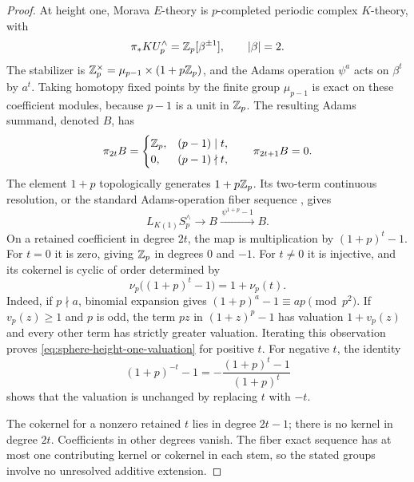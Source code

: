 \begin{proof}
At height one, Morava $E$-theory is $p$-completed periodic complex
$K$-theory, with
\[
 \pi_*KU_p^\wedge=\mathbb Z_p[\beta^{\pm1}],\qquad |\beta|=2.
\]
The stabilizer is
$\mathbb Z_p^\times=\mu_{p-1}\times(1+p\mathbb Z_p)$, and the Adams operation
$\psi^a$ acts on $\beta^t$ by $a^t$.
Taking homotopy fixed points by the finite group $\mu_{p-1}$ is exact
on these coefficient modules, because $p-1$ is a unit in $\mathbb Z_p$.
The resulting Adams summand, denoted $B$, has
\[
 \pi_{2t}B=
 \begin{cases}\mathbb Z_p,&(p-1)\mid t,\\0,&(p-1)\nmid t,
 \end{cases}
 \qquad \pi_{2t+1}B=0.
\]
The element $1+p$ topologically generates $1+p\mathbb Z_p$.  Its two-term
continuous resolution, or the standard Adams-operation fiber sequence
\citep[\S\S1--2]{hopkinsKOne}, gives
\[
 L_{K(1)}S_p^\wedge\longrightarrow B
 \xrightarrow{\,\psi^{1+p}-1\,}B.
\]
On a retained coefficient in degree $2t$, the map is multiplication
by $(1+p)^t-1$.  For $t=0$ it is zero, giving $\mathbb Z_p$ in degrees $0$
and $-1$.  For $t\neq0$ it is injective, and its cokernel is cyclic of
order determined by
\begin{equation}\label{eq:sphere-height-one-valuation}
 \nu_p\bigl((1+p)^t-1\bigr)=1+\nu_p(t).
\end{equation}
Indeed, if $p\nmid a$, binomial expansion gives
$(1+p)^a-1\equiv ap\pmod{p^2}$.  If $v_p(z)\geq1$ and $p$ is odd,
the term $pz$ in $(1+z)^p-1$ has valuation $1+v_p(z)$ and every other
term has strictly greater valuation.  Iterating this observation proves
\eqref{eq:sphere-height-one-valuation} for positive $t$.  For negative
$t$, the identity
\[
 (1+p)^{-t}-1=-\frac{(1+p)^t-1}{(1+p)^t}
\]
shows that the valuation is unchanged by replacing $t$ with $-t$.

The cokernel for a nonzero retained $t$ lies in degree $2t-1$; there is
no kernel in degree $2t$.  Coefficients in other degrees vanish.  The
fiber exact sequence has at most one contributing kernel or cokernel
in each stem, so the stated groups involve no unresolved additive
extension.
\end{proof}
